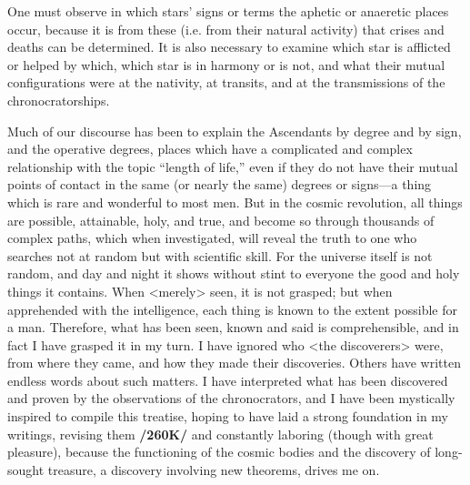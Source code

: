 One must observe in which stars’ signs or terms the aphetic or anaeretic places occur, because it is from these (i.e. from their natural activity) that crises and deaths can be determined. It is also necessary to examine which star is afflicted or helped by which, which star is in harmony or is not, and what their mutual configurations were at the nativity, at transits, and at the transmissions of the chronocratorships.

Much of our discourse has been to explain the Ascendants by degree and by sign, and the operative degrees, places which have a complicated and complex relationship with the topic “length of life,” even if they do not have their mutual points of contact in the same (or nearly the same) degrees or signs—a thing which is rare and wonderful to most men. But in the cosmic revolution, all things are possible, attainable, holy, and true, and become so through thousands of complex paths, which when investigated, will reveal the truth to one who searches not at random but with scientific skill. For the universe itself is not random, and day and night it shows without stint to everyone the good and holy things it contains. When <merely> seen, it is not grasped; but when apprehended with the intelligence, each thing is known to the extent possible for a man. Therefore, what has been seen, known and said is comprehensible, and in fact I have grasped it in my turn. I have ignored who <the discoverers> were, from where they came, and how they made their discoveries. Others have written endless words about such matters. I have interpreted
what has been discovered and proven by the observations of the chronocrators, and I have been mystically inspired to compile this treatise, hoping to have laid a strong foundation in my writings, revising them \textbf{/260K/} and constantly laboring (though with great pleasure), because the functioning of the cosmic bodies and the discovery of long-sought treasure, a discovery involving new theorems, drives me on.

\newpage